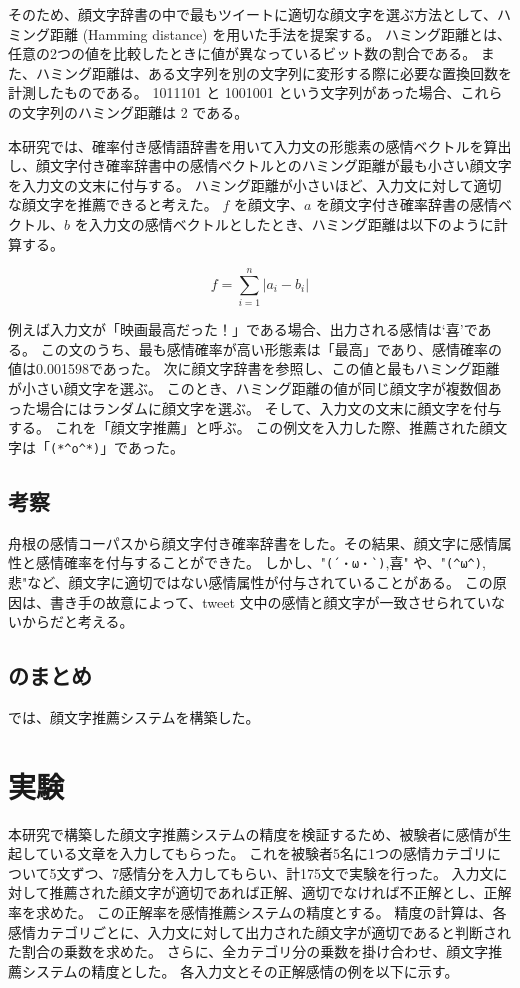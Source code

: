 \documentclass[11pt,a4j]{jsarticle}
\begin{document}
そのため、顔文字辞書の中で最もツイートに適切な顔文字を選ぶ方法として、ハミング距離 (Hamming distance) を用いた手法を提案する。
ハミング距離とは、任意の2つの値を比較したときに値が異なっているビット数の割合である。
また、ハミング距離は、ある文字列を別の文字列に変形する際に必要な置換回数を計測したものである。
1011101 と 1001001 という文字列があった場合、これらの文字列のハミング距離は 2 である。

本研究では、確率付き感情語辞書を用いて入力文の形態素の感情ベクトルを算出し、顔文字付き確率辞書中の感情ベクトルとのハミング距離が最も小さい顔文字を入力文の文末に付与する。
ハミング距離が小さいほど、入力文に対して適切な顔文字を推薦できると考えた。
$f$ を顔文字、$a$ を顔文字付き確率辞書の感情ベクトル、$b$ を入力文の感情ベクトルとしたとき、ハミング距離は以下のように計算する。

\[
  f=\sum_{i=1}^{n} |a_i-b_i|
\]

例えば入力文が「映画最高だった！」である場合、出力される感情は`喜'である。
この文のうち、最も感情確率が高い形態素は「最高」であり、感情確率の値は0.001598であった。
次に顔文字辞書を参照し、この値と最もハミング距離が小さい顔文字を選ぶ。
このとき、ハミング距離の値が同じ顔文字が複数個あった場合にはランダムに顔文字を選ぶ。
そして、入力文の文末に顔文字を付与する。
これを「顔文字推薦」と呼ぶ。
この例文を入力した際、推薦された顔文字は「\verb|(*^o^*)|」であった。

  \subsection{考察}
舟根の感情コーパスから顔文字付き確率辞書をした。その結果、顔文字に感情属性と感情確率を付与することができた。
しかし、"\verb|(´・ω・`)|,喜" や、"\verb|(^ω^)|,悲"など、顔文字に適切ではない感情属性が付与されていることがある。
この原因は、書き手の故意によって、tweet 文中の感情と顔文字が一致させられていないからだと考える。

  \subsection{ のまとめ}
では、顔文字推薦システムを構築した。

\section{実験}\label{sec:experiment}
本研究で構築した顔文字推薦システムの精度を検証するため、被験者に感情が生起している文章を入力してもらった。
これを被験者5名に1つの感情カテゴリについて5文ずつ、7感情分を入力してもらい、計175文で実験を行った。
入力文に対して推薦された顔文字が適切であれば正解、適切でなければ不正解とし、正解率を求めた。
この正解率を感情推薦システムの精度とする。
精度の計算は、各感情カテゴリごとに、入力文に対して出力された顔文字が適切であると判断された割合の乗数を求めた。
さらに、全カテゴリ分の乗数を掛け合わせ、顔文字推薦システムの精度とした。
各入力文とその正解感情の例を以下に示す。
\end{document}
